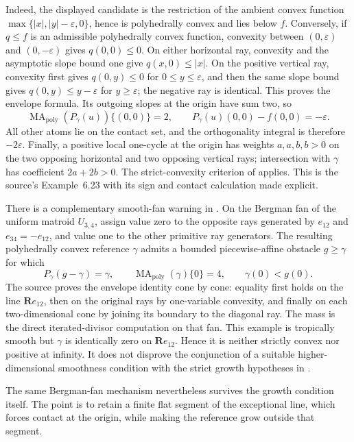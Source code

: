 \documentclass[11pt,a4paper]{article}
\theoremstyle{definition}
\theoremstyle{remark}
\DeclareMathOperator{\MA}{MA}
\begin{document}
Indeed, the displayed candidate is the restriction of the ambient convex
function
\(
 \max\{|x|,|y|-\varepsilon,0\}
\), hence is polyhedrally convex and lies below \(f\).  Conversely, if
\(q\leq f\) is an admissible polyhedrally convex function, convexity between
\((0,\varepsilon)\) and \((0,-\varepsilon)\) gives \(q(0,0)\leq0\).
On either horizontal ray, convexity and the asymptotic slope bound one give
\(q(x,0)\leq|x|\).  On the positive vertical ray, convexity first gives
\(q(0,y)\leq0\) for \(0\leq y\leq\varepsilon\), and then the same slope
bound gives \(q(0,y)\leq y-\varepsilon\) for
\(y\geq\varepsilon\); the negative ray is identical.  This proves the
envelope formula.  Its outgoing slopes at the origin have sum two, so
\[
 \MA_{\mathrm{poly}}(P_\gamma(u))\{(0,0)\}=2,
 \qquad P_\gamma(u)(0,0)-f(0,0)=-\varepsilon.
\]
All other atoms lie on the contact set, and the orthogonality integral is
therefore \(-2\varepsilon\).  Finally, a positive local one-cycle at the
origin has weights \(a,a,b,b>0\) on the two opposing horizontal and two
opposing vertical rays; intersection with \(\gamma\) has coefficient
\(2a+2b>0\).  The strict-convexity criterion of
\cite[Remark~3.9]{BMPS26} applies.  This is the source's Example~6.23 with
its sign and contact calculation made explicit.

There is a complementary smooth-fan warning in
\cite[Example~6.24, Claim~6.25, and Remark~6.26]{BMPS26}.  On the Bergman
fan of the uniform matroid \(U_{3,4}\), assign value zero to the opposite
rays generated by \(e_{12}\) and \(e_{34}=-e_{12}\), and value one to the
other primitive ray generators.  The resulting polyhedrally convex
reference \(\gamma\) admits a bounded piecewise-affine obstacle \(g\geq
\gamma\) for which
\[
 P_\gamma(g-\gamma)=\gamma,
 \qquad
 \MA_{\mathrm{poly}}(\gamma)\{0\}=4,
 \qquad
 \gamma(0)<g(0).
\]
The source proves the envelope identity cone by cone: equality first holds
on the line \(\mathbf R e_{12}\), then on the original rays by one-variable
convexity, and finally on each two-dimensional cone by joining its boundary
to the diagonal ray.  The mass is the direct iterated-divisor computation
on that fan.  This example is tropically smooth but \(\gamma\) is identically
zero on \(\mathbf R e_{12}\).  Hence it is neither strictly convex nor
positive at infinity.  It does not disprove the conjunction of a suitable
higher-dimensional smoothness condition with the strict growth hypotheses
in .

The same Bergman-fan mechanism nevertheless survives the growth condition
itself.  The point is to retain a finite flat segment of the exceptional
line, which forces contact at the origin, while making the reference grow
outside that segment.
\end{document}
